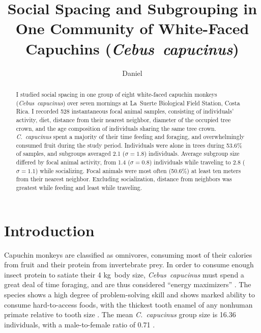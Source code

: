 \documentclass[american]{../../../coursework}
\title{Social Spacing and Subgrouping in One Community of White-Faced Capuchins (\emph{Cebus~capucinus})}
\subtitle{}
\author{Daniel}{Glenn}{Leonard}
\date{\displaydate{date}}
\begin{document}
\setcounter{page}{6}
\maketitle

\begin{abstract}
    I studied social spacing in one group of eight white-faced capuchin
    monkeys (\emph{Cebus~capucinus}) over seven mornings at La~Suerte
    Biological Field Station, Costa Rica. I recorded 528 instantaneous focal
    animal samples, consisting of individuals' activity, diet, distance from
    their nearest neighbor, diameter of the occupied tree crown, and the age
    composition of individuals sharing the same tree crown.
    \emph{C.~capucinus} spent a majority of their time feeding and foraging,
    and overwhelmingly consumed fruit during the study period. Individuals
    were alone in trees during 53.6\% of samples, and subgroups averaged 2.1
    (\(\sigma = 1.8\)) individuals. Average subgroup size differed by focal
    animal activity, from 1.4 (\(\sigma = 0.8\)) individuals while traveling
    to 2.8 (\(\sigma = 1.1\)) while socializing. Focal animals were most often
    (50.6\%) at least ten meters from their nearest neighbor. Excluding
    socialization, distance from neighbors was greatest while feeding and
    least while traveling.
\end{abstract}

\printkeywords

\section{Introduction}

Capuchin monkeys are classified as omnivores, consuming most of their calories
from fruit and their protein from invertebrate prey. In order to consume
enough insect protein to satiate their 4 kg~body size, \emph{Cebus~capucinus}
must spend a great deal of time foraging, and are thus considered ``energy
maximizers'' \parencite{Fragaszy2004}. The species shows a high degree of
problem-solving skill and shows marked ability to consume hard-to-access
foods, with the thickest tooth enamel of any nonhuman primate relative to
tooth size \parencite{Jack2011}. The mean \emph{C.~capucinus} group size is
16.36 individuals, with a male-to-female ratio of 0.71
\parencite{Fragaszy2004}.
\end{document}
